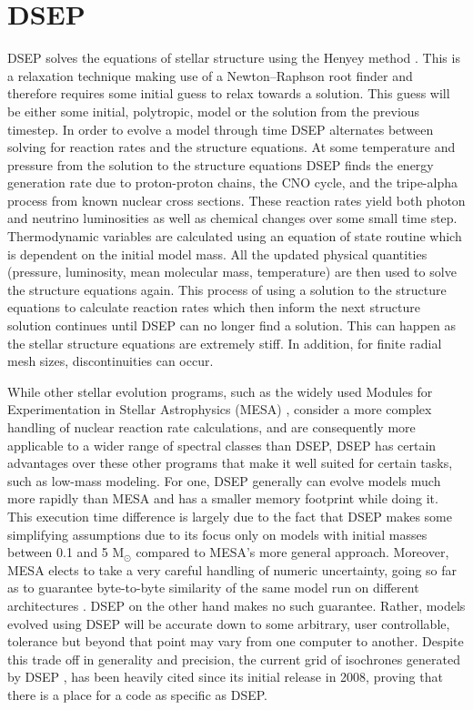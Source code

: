 \section{DSEP}
DSEP solves the equations of stellar structure using the Henyey method
\citep{Henyey1964}. This is a relaxation technique making use of a
Newton–Raphson root finder and therefore requires some initial guess to relax
towards a solution. This guess will be either some initial, polytropic, model
or the solution from the previous timestep.  In order to evolve a model through
time DSEP alternates between solving for reaction rates and the structure
equations. At some temperature and pressure from the solution to the structure
equations DSEP finds the energy generation rate due to proton-proton chains,
the CNO cycle, and the tripe-alpha process from known nuclear cross sections.
These reaction rates yield both photon and neutrino luminosities as well as
chemical changes over some small time step. Thermodynamic variables are
calculated using an equation of state routine which is dependent on the initial
model mass. All the updated physical quantities (pressure, luminosity, mean
molecular mass, temperature) are then used to solve the structure equations
again. This process of using a solution to the structure equations to calculate
reaction rates which then inform the next structure solution continues until
DSEP can no longer find a solution.  This can happen as the stellar structure
equations are extremely stiff. In addition, for finite radial mesh sizes,
discontinuities can occur.

While other stellar evolution programs, such as the widely used Modules for
Experimentation in Stellar Astrophysics (MESA) \citep{Paxton2011}, consider a
more complex handling of nuclear reaction rate calculations, and are
consequently more applicable to a wider range of spectral classes than DSEP,
DSEP has certain advantages over these other programs that make it well suited
for certain tasks, such as low-mass modeling. For one, DSEP generally can
evolve models much more rapidly than MESA and has a smaller memory footprint
while doing it. This execution time difference is largely due to the fact that
DSEP makes some simplifying assumptions due to its focus only on models with
initial masses between 0.1 and 5 M$_{\odot}$ compared to MESA’s more general
approach.  Moreover, MESA elects to take a very careful handling of numeric
uncertainty, going so far as to guarantee byte-to-byte similarity of the same
model run on different architectures \citep{Paxton2011}. DSEP on the other hand
makes no such guarantee. Rather, models evolved using DSEP will be accurate
down to some arbitrary, user controllable, tolerance but beyond that point may
vary from one computer to another. Despite this trade off in generality and
precision, the current grid of isochrones generated by DSEP \citep{Dotter2008},
has been heavily cited since its initial release in 2008, proving that there is
a place for a code as specific as DSEP.

